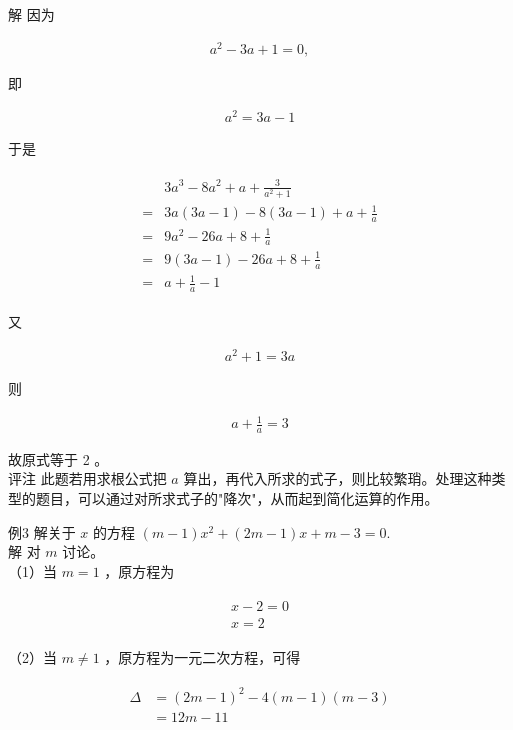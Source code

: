 \documentclass[10pt]{article}
\begin{document}
解 因为

\begin{align*}
a^{2}-3 a+1=0,
\end{align*}

即

\begin{align*}
a^{2}=3 a-1
\end{align*}

于是

\begin{align*}
\begin{aligned}
& 3 a^{3}-8 a^{2}+a+\frac{3}{a^{2}+1} \\
= & 3 a(3 a-1)-8(3 a-1)+a+\frac{1}{a} \\
= & 9 a^{2}-26 a+8+\frac{1}{a} \\
= & 9(3 a-1)-26 a+8+\frac{1}{a} \\
= & a+\frac{1}{a}-1
\end{aligned}
\end{align*}

又

\begin{align*}
a^{2}+1=3 a
\end{align*}

则

\begin{align*}
a+\frac{1}{a}=3
\end{align*}

故原式等于 2 。\\
评注 此题若用求根公式把 $a$ 算出，再代入所求的式子，则比较繁琑。处理这种类型的题目，可以通过对所求式子的"降次"，从而起到简化运算的作用。

例3 解关于 $x$ 的方程 $(m-1) x^{2}+(2 m-1) x+m-3=0$.\\
解 对 $m$ 讨论。\\
（1）当 $m=1$ ，原方程为

\begin{align*}
\begin{gathered}
x-2=0 \\
x=2
\end{gathered}
\end{align*}

（2）当 $m \neq 1$ ，原方程为一元二次方程，可得

\begin{align*}
\begin{aligned}
\Delta & =(2 m-1)^{2}-4(m-1)(m-3) \\
& =12 m-11
\end{aligned}
\end{align*}
\end{document}
